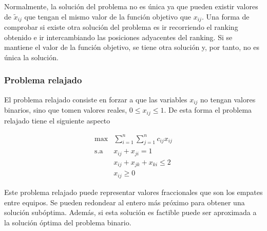 Normalmente, la solución del problema no es única ya que pueden existir valores de $\tilde{x}_{ij}$ que tengan el mismo valor de la función objetivo que $x_{ij}$. Una forma de comprobar si existe otra solución del problema es ir recorriendo el ranking obtenido e ir intercambiando las posiciones adyacentes del ranking. Si se mantiene el valor de la función objetivo, se tiene otra solución y, por tanto, no es única la solución.

\subsubsection{Problema relajado}

El problema relajado consiste en forzar a que las variables $x_{ij}$ no tengan valores binarios, sino que tomen valores reales, $0 \leq x_{ij} \leq 1$. De esta forma el problema relajado tiene el siguiente aspecto

\begin{equation} \label{eq:problema_relajado}
\begin{array}{rl}
\max         & \sum\limits_{i=1}^{n} \sum\limits_{j=1}^{n} c_{ij} x_{ij}\\
\mathrm{s.a} & x_{ij} + x_{ji} = 1\\
             & x_{ij} + x_{jk} + x_{ki} \leq 2\\
             & x_{ij} \geq 0
\end{array}
\end{equation}

Este problema relajado puede representar valores fraccionales que son los empates entre equipos. Se pueden redondear al entero más próximo para obtener una solución subóptima. Además, si esta solución es factible puede ser aproximada a la solución óptima del problema binario. 

